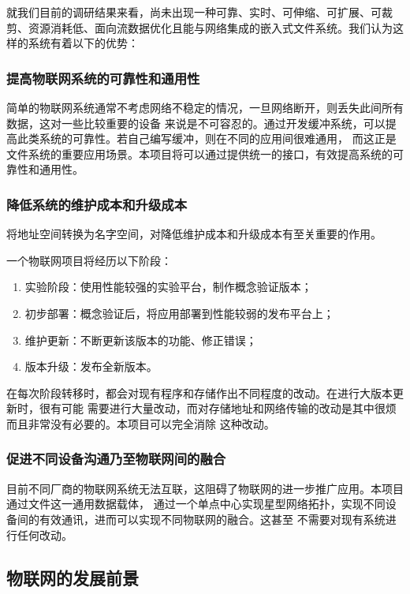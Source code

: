 \documentclass{ctexart}
\begin{document}
就我们目前的调研结果来看，尚未出现一种可靠、实时、可伸缩、可扩展、可裁剪、资源消耗低、面向流数据优化且能与网络集成的嵌入式文件系统。我们认为这样的系统有着以下的优势：

\subsubsection{提高物联网系统的可靠性和通用性}

简单的物联网系统通常不考虑网络不稳定的情况，一旦网络断开，则丢失此间所有数据，这对一些比较重要的设备
来说是不可容忍的。通过开发缓冲系统，可以提高此类系统的可靠性。若自己编写缓冲，则在不同的应用间很难通用，
而这正是文件系统的重要应用场景。本项目将可以通过提供统一的接口，有效提高系统的可靠性和通用性。

\subsubsection{降低系统的维护成本和升级成本}
将地址空间转换为名字空间，对降低维护成本和升级成本有至关重要的作用。

一个物联网项目将经历以下阶段：
\begin{enumerate}
	\item 实验阶段：使用性能较强的实验平台，制作概念验证版本；
	\item 初步部署：概念验证后，将应用部署到性能较弱的发布平台上；
	\item 维护更新：不断更新该版本的功能、修正错误；
	\item 版本升级：发布全新版本。
\end{enumerate}
在每次阶段转移时，都会对现有程序和存储作出不同程度的改动。在进行大版本更新时，很有可能
需要进行大量改动，而对存储地址和网络传输的改动是其中很烦而且非常没有必要的。本项目可以完全消除
这种改动。

\subsubsection{促进不同设备沟通乃至物联网间的融合}

目前不同厂商的物联网系统无法互联，这阻碍了物联网的进一步推广应用。本项目通过文件这一通用数据载体，
通过一个单点中心实现星型网络拓扑，实现不同设备间的有效通讯，进而可以实现不同物联网的融合。这甚至
不需要对现有系统进行任何改动。

\subsection{物联网的发展前景}
\end{document}
